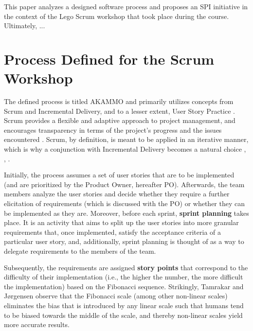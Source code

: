 \documentclass[conference]{IEEEtran}
\begin{document}
This paper analyzes a designed software process and proposes an SPI initiative 
in the context of the Lego Scrum workshop that took place during the course.
Ultimately, ... %

\section{Process Defined for the Scrum Workshop}
\label{sec:process}


The defined process is titled {\selectfont AKAMMO} and primarily
utilizes concepts from Scrum and Incremental Delivery, and to a lesser extent,
User Story Practice \cite{DIT348A1}. Scrum provides a flexible and adaptive
approach to project management, and encourages transparency in terms of the
project's progress and the issues encountered \cite{Schwaber2020}. Scrum, by
definition, is meant to be applied in an iterative manner, which is why a
conjunction with Incremental Delivery becomes a natural choice
\cite{Schwaber2020}, \cite{Srivastava2017}, \cite{Schwaber1997}.

Initially, the process assumes a set of user stories that are to be implemented
(and are prioritized by the Product Owner, hereafter PO). Afterwards, the team
members analyze the user stories and decide whether they require a further
elicitation of requirements (which is discussed with the PO) or whether they
can be implemented as they are.
Moreover, before each sprint, \textbf{sprint planning} takes place. It is an
activity that aims to split up the user stories into more granular requirements
that, once implemented, satisfy the acceptance criteria of a particular user
story, and, additionally, sprint planning is thought of as a way to delegate
requirements to the members of the team.

Subsequently, the requirements are assigned \textbf{story points} that
correspond to the difficulty of their implementation (i.e., the higher
the number, the more difficult the implementation) based on the Fibonacci
sequence. Strikingly, Tamrakar and Jørgensen \cite{Tamrakar2012} observe that
the Fibonacci scale (among other non-linear scales) eliminates the bias that is
introduced by any linear scale such that humans tend to be biased towards the
middle of the scale, and thereby non-linear scales yield more accurate results.
\end{document}
